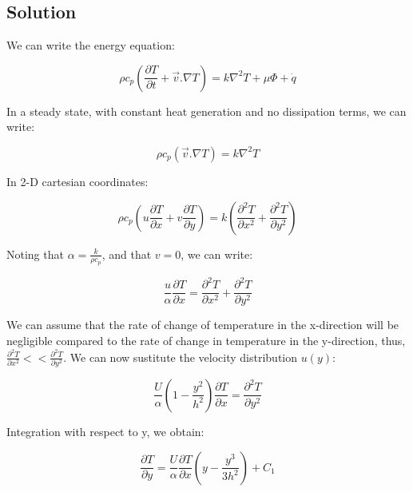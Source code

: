 \subsection{Solution}
We can write the energy equation:

\begin{equation}
\rho c_p \left( \frac{\partial T}{\partial t} + \vec{v}.\nabla T \right) = k \nabla^2 T + \mu \Phi + \dot{q}
\end{equation}

In a steady state, with constant heat generation and no dissipation terms, we can write:


\begin{equation}
\rho c_p \left( \vec{v}.\nabla T \right) = k \nabla^2 T
\end{equation}

In 2-D cartesian coordinates:

\begin{equation}
\rho c_p \left( u\frac{\partial T}{\partial x} + v\frac{\partial T}{\partial y} \right) = k \left( \frac{\partial^2 T}{\partial x^2} + \frac{\partial^2 T}{\partial y^2} \right)
\end{equation}

Noting that $\alpha = \frac{k}{\rho c_p}$, and that $v = 0$, we can write:


\begin{equation}
\frac{u}{\alpha} \frac{\partial T}{\partial x} = \frac{\partial^2 T}{\partial x^2} + \frac{\partial^2 T}{\partial y^2}
\end{equation}

We can assume that the rate of change of temperature in the x-direction will be negligible compared to the rate of change in temperature in the y-direction, thus, $\frac{\partial^2 T}{\partial x^2} << \frac{\partial^2 T}{\partial y^2}$. We can now sustitute the velocity distribution $u(y)$:


\begin{equation}
\frac{U}{\alpha} \left( 1 - \frac{y^2}{h^2} \right) \frac{\partial T}{\partial x} = \frac{\partial^2 T}{\partial y^2}
\end{equation}

Integration with respect to y, we obtain:

\begin{equation}
\frac{\partial T}{\partial y} = \frac{U}{\alpha} \frac{\partial T}{\partial x} \left( y - \frac{y^3}{3h^2} \right) + C_1
\end{equation}

